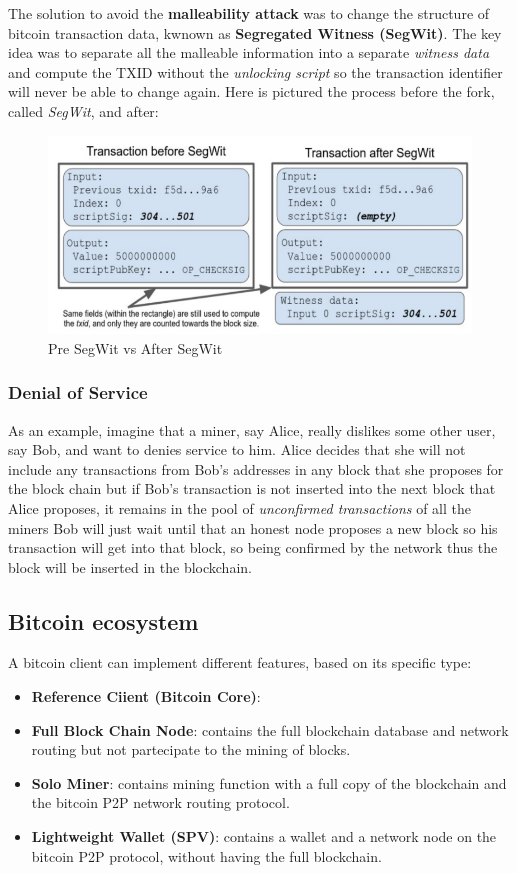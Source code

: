 \documentclass[10pt,a4paper]{report}
\begin{document}
The solution to avoid the \textbf{malleability attack} was to change the structure of bitcoin transaction data, kwnown as \textbf{Segregated Witness (SegWit)}.
The key idea was to separate all the malleable information into a separate \textit{witness data} and compute the TXID without the \textit{unlocking script} so the transaction identifier will never be able to change again. Here is pictured the process before the fork, called \textit{SegWit}, and after:
\begin{figure}[h]
	\centering
	\includegraphics[scale=0.50]{images/Pasted image 20230412120506.png}
	\caption{Pre SegWit vs After SegWit}
\end{figure}

\subsubsection{Denial of Service}\label{sec:denial-of-service}
As an example, imagine that a miner, say Alice, really dislikes some other user, say Bob, and want to denies service to him.
Alice decides that she will not include any transactions from Bob’s addresses in any block that she proposes for the block chain but if Bob’s transaction is not inserted into the next block that Alice proposes, it remains in the pool of \textit{unconfirmed transactions} of all the miners
Bob will just wait until that an honest node proposes a new block so his transaction will get into that block, so being confirmed by the network thus the block will be inserted in the blockchain.
\subsection{Bitcoin ecosystem}\label{sec:bitcoin-ecosystem}
A bitcoin client can implement different features, based on its specific type:
\begin{itemize}
	\item 
	\textbf{Reference Ciient (Bitcoin Core)}:
	\item 
	\textbf{Full Block Chain Node}: contains the full blockchain database and network routing but not partecipate to the mining of blocks.
	\item 
	\textbf{Solo Miner}: contains mining function with a full copy of the blockchain and the bitcoin P2P network routing protocol.
	\item 
	\textbf{Lightweight Wallet (SPV)}: contains a wallet and a network node on the bitcoin P2P protocol, without having the full blockchain.
\end{itemize}
\end{document}
